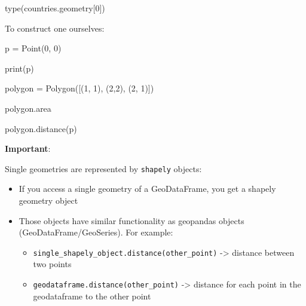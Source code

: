 \documentclass[
  letterpaper,
  DIV=11,
  numbers=noendperiod]{scrreprt}
\newenvironment{Shaded}{\begin{snugshade}}{\end{snugshade}}
\newcommand{\BuiltInTok}[1]{\textcolor[rgb]{0.00,0.23,0.31}{#1}}
\newcommand{\DecValTok}[1]{\textcolor[rgb]{0.68,0.00,0.00}{#1}}
\newcommand{\NormalTok}[1]{\textcolor[rgb]{0.00,0.23,0.31}{#1}}
\newcommand{\OperatorTok}[1]{\textcolor[rgb]{0.37,0.37,0.37}{#1}}
\providecommand{\tightlist}{%
  \setlength{\itemsep}{0pt}\setlength{\parskip}{0pt}}\usepackage{longtable,booktabs,array}
\begin{document}
\begin{Shaded}
\begin{Highlighting}[]
\BuiltInTok{type}\NormalTok{(countries.geometry[}\DecValTok{0}\NormalTok{])}
\end{Highlighting}
\end{Shaded}

To construct one ourselves:

\begin{Shaded}
\begin{Highlighting}[]
\NormalTok{p }\OperatorTok{=}\NormalTok{ Point(}\DecValTok{0}\NormalTok{, }\DecValTok{0}\NormalTok{)}
\end{Highlighting}
\end{Shaded}

\begin{Shaded}
\begin{Highlighting}[]
\BuiltInTok{print}\NormalTok{(p)}
\end{Highlighting}
\end{Shaded}

\begin{Shaded}
\begin{Highlighting}[]
\NormalTok{polygon }\OperatorTok{=}\NormalTok{ Polygon([(}\DecValTok{1}\NormalTok{, }\DecValTok{1}\NormalTok{), (}\DecValTok{2}\NormalTok{,}\DecValTok{2}\NormalTok{), (}\DecValTok{2}\NormalTok{, }\DecValTok{1}\NormalTok{)])}
\end{Highlighting}
\end{Shaded}

\begin{Shaded}
\begin{Highlighting}[]
\NormalTok{polygon.area}
\end{Highlighting}
\end{Shaded}

\begin{Shaded}
\begin{Highlighting}[]
\NormalTok{polygon.distance(p)}
\end{Highlighting}
\end{Shaded}

\textbf{Important}:

Single geometries are represented by \texttt{shapely} objects:

\begin{itemize}
\tightlist
\item
  If you access a single geometry of a GeoDataFrame, you get a shapely
  geometry object
\item
  Those objects have similar functionality as geopandas objects
  (GeoDataFrame/GeoSeries). For example:

  \begin{itemize}
  \tightlist
  \item
    \texttt{single\_shapely\_object.distance(other\_point)}
    -\textgreater{} distance between two points
  \item
    \texttt{geodataframe.distance(other\_point)} -\textgreater{}
    distance for each point in the geodataframe to the other point
  \end{itemize}
\end{itemize}
\end{document}
